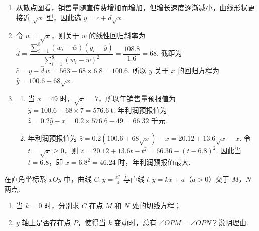 \begin{solution}
\begin{enumerate}
\item 从散点图看，销售量随宣传费增加而增加，但增长速度逐渐减小，曲线形状更接近 \(\sqrt{x}\) 型，因此选 \(y=c+d\sqrt{x}\).
\item 令 \(w=\sqrt{x}\)，则关于 \(w\) 的线性回归斜率为
\(\hat d=\dfrac{\sum_{i=1}^{8}(w_i-\overline w)(y_i-\overline y)}{\sum_{i=1}^{8}(w_i-\overline w)^2}=\dfrac{108.8}{1.6}=68\). 截距为 \(\hat c=\overline y-\hat d\,\overline w=563-68\times6.8=100.6\). 所以 \(y\) 关于 \(x\) 的回归方程为 \(\hat y=100.6+68\sqrt{x}\).
\item
\begin{enumerate}
	\item 当 \(x=49\) 时，\(\sqrt{x}=7\)，所以年销售量预报值为 \(\hat y=100.6+68\times7=576.6\mathrm{~t}\). 年利润预报值为 \(\hat z=0.2\hat y-x=0.2\times576.6-49=66.32\text{~千元}\).
\item 年利润预报值为
\(\hat z=0.2(100.6+68\sqrt{x})-x=20.12+13.6\sqrt{x}-x\). 令 \(t=\sqrt{x}\geqslant0\)，则 \(\hat z=20.12+13.6t-t^2=66.36-(t-6.8)^2\). 因此当 \(t=6.8\)，即 \(x=6.8^2=46.24\) 时，年利润预报值最大.
\end{enumerate}
\end{enumerate}
\end{solution}

\begin{problem}
在直角坐标系 \(xOy\) 中，曲线 \(C: y = \frac{x^2}{4}\) 与直线 \(l: y = kx + a\)（\(a > 0\)）交于 \(M\)，\(N\) 两点.

\begin{enumerate}
\item 当 \(k = 0\) 时，分别求 \(C\) 在点 \(M\) 和 \(N\) 处的切线方程；
\item \(y\) 轴上是否存在点 \(P\)，使得当 \(k\) 变动时，总有 \(\angle OPM = \angle OPN\)？说明理由.
\end{enumerate}
\end{problem}

